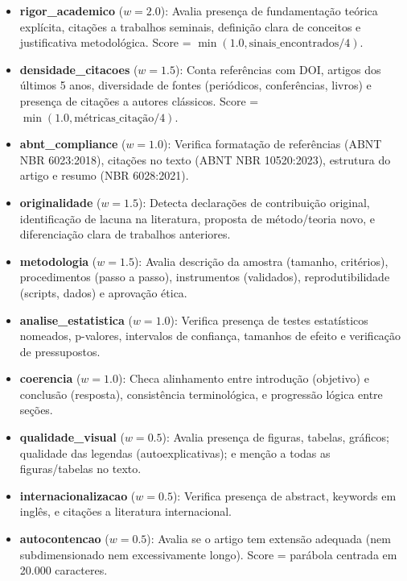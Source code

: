 \begin{itemize}
  \item \textbf{rigor\_academico} ($w=2.0$): Avalia presença de fundamentação teórica explícita, citações a trabalhos seminais, definição clara de conceitos e justificativa metodológica. Score = $\min(1.0, \text{sinais\_encontrados} / 4)$.
  
  \item \textbf{densidade\_citacoes} ($w=1.5$): Conta referências com DOI, artigos dos últimos 5 anos, diversidade de fontes (periódicos, conferências, livros) e presença de citações a autores clássicos. Score = $\min(1.0, \text{métricas\_citação} / 4)$.
  
  \item \textbf{abnt\_compliance} ($w=1.0$): Verifica formatação de referências (ABNT NBR 6023:2018), citações no texto (ABNT NBR 10520:2023), estrutura do artigo e resumo (NBR 6028:2021).
  
  \item \textbf{originalidade} ($w=1.5$): Detecta declarações de contribuição original, identificação de lacuna na literatura, proposta de método/teoria novo, e diferenciação clara de trabalhos anteriores.
  
  \item \textbf{metodologia} ($w=1.5$): Avalia descrição da amostra (tamanho, critérios), procedimentos (passo a passo), instrumentos (validados), reprodutibilidade (scripts, dados) e aprovação ética.
  
  \item \textbf{analise\_estatistica} ($w=1.0$): Verifica presença de testes estatísticos nomeados, p-valores, intervalos de confiança, tamanhos de efeito e verificação de pressupostos.
  
  \item \textbf{coerencia} ($w=1.0$): Checa alinhamento entre introdução (objetivo) e conclusão (resposta), consistência terminológica, e progressão lógica entre seções.
  
  \item \textbf{qualidade\_visual} ($w=0.5$): Avalia presença de figuras, tabelas, gráficos; qualidade das legendas (autoexplicativas); e menção a todas as figuras/tabelas no texto.
  
  \item \textbf{internacionalizacao} ($w=0.5$): Verifica presença de abstract, keywords em inglês, e citações a literatura internacional.
  
  \item \textbf{autocontencao} ($w=0.5$): Avalia se o artigo tem extensão adequada (nem subdimensionado nem excessivamente longo). Score = parábola centrada em 20.000 caracteres.
\end{itemize}

